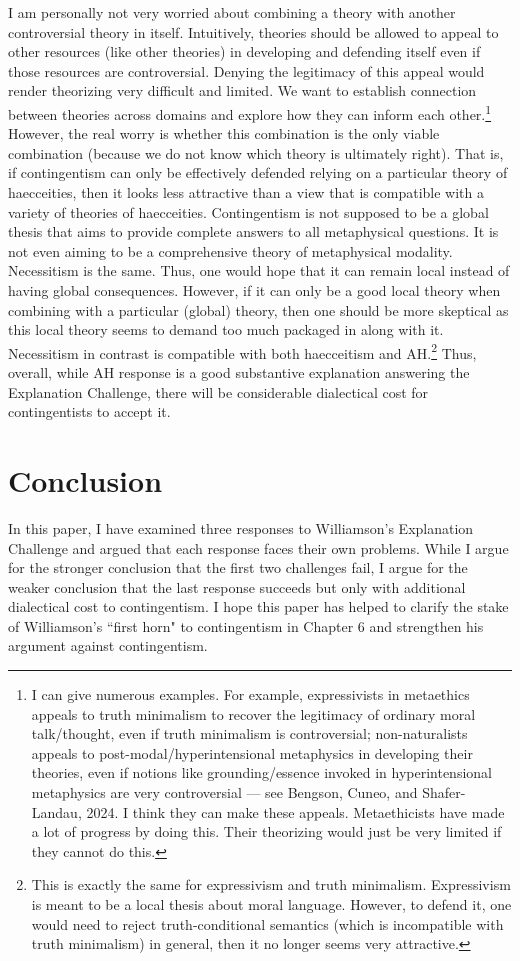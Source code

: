I am personally not very worried about combining a theory with another controversial theory in itself. Intuitively, theories should be allowed to appeal to other resources (like other theories) in developing and defending itself even if those resources are controversial. Denying the legitimacy of this appeal would render theorizing very difficult and limited. We want to establish connection between theories across domains and explore how they can inform each other.\footnote{I can give numerous examples. For example, expressivists in metaethics appeals to truth minimalism to recover the legitimacy of ordinary moral talk/thought, even if truth minimalism is controversial; non-naturalists appeals to post-modal/hyperintensional metaphysics in developing their theories, even if notions like grounding/essence invoked in hyperintensional metaphysics are very controversial --- see Bengson, Cuneo, and Shafer-Landau, 2024. I think they can make these appeals. Metaethicists have made a lot of progress by doing this. Their theorizing would just be very limited if they cannot do this. }
However, the real worry is whether this combination is the only viable combination (because we do not know which theory is ultimately right). That is, if contingentism can only be effectively defended relying on a particular theory of haecceities, then it looks less attractive than a view that is compatible with a variety of theories of haecceities. 
Contingentism is not supposed to be a global thesis that aims to provide complete answers to all metaphysical questions. It is not even aiming to be a comprehensive theory of metaphysical modality. Necessitism is the same. Thus, one would hope that it can remain local instead of having global consequences. However, if it can only be a good local theory when combining with a particular (global) theory, then one should be more skeptical as this local theory seems to demand too much packaged in along with it. Necessitism in contrast is compatible with both haecceitism and AH.\footnote{This is exactly the same for expressivism and truth minimalism. Expressivism is meant to be a local thesis about moral language. However, to defend it, one would need to reject truth-conditional semantics (which is incompatible with truth minimalism) in general, then it no longer seems very attractive.}
Thus, overall, while AH response is a good substantive explanation answering the Explanation Challenge, there will be considerable dialectical cost for contingentists to accept it.  

\section{Conclusion}
In this paper, I have examined three responses to Williamson's Explanation Challenge and argued that each response faces their own problems. While I argue for the stronger conclusion that the first two challenges fail, I argue for the weaker conclusion that the last response succeeds but only with additional dialectical cost to contingentism. I hope this paper has helped to clarify the stake of Williamson's ``first horn" to contingentism in Chapter 6 and strengthen his argument against contingentism. 

